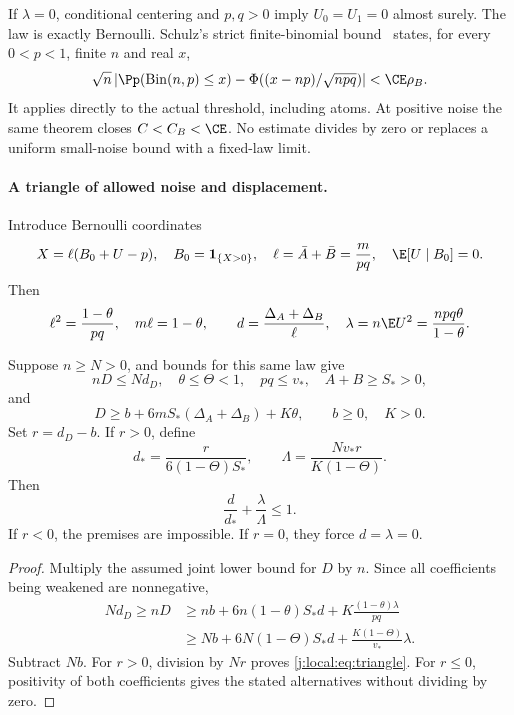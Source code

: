 If $\lambda=0$, conditional centering and $p,q>0$ imply $U_0=U_1=0$
almost surely. The law is exactly Bernoulli. Schulz's strict finite-binomial
bound~\cite[Theorem~1]{Schulz2016} states, for every $0<p<1$, finite $n$
and real $x$,
\[
 \sqrt n\left|\Pp(\operatorname{Bin}(n,p)\le x)
 -\Phi((x-np)/\sqrt{npq})\right|<\CE\rho_B.
\]
It applies directly to the actual threshold, including atoms. At positive
noise the same theorem closes $C<C_B<\CE$. No estimate divides by zero
or replaces a uniform small-noise bound with a fixed-law limit.

\paragraph{A triangle of allowed noise and displacement.}
Introduce Bernoulli coordinates
\[
 X=\ell(B_0+U-p),\quad B_0=\mathbf1_{\{X>0\}},\quad
 \ell=\bar A+\bar B=\frac m{pq},\quad \E[U\mid B_0]=0.
\]
Then
\[
 \ell^2=\frac{1-\theta}{pq},\quad m\ell=1-\theta,
 \qquad d=\frac{\Delta_A+\Delta_B}{\ell},\quad
 \lambda=n\E U^2=\frac{npq\theta}{1-\theta}.
\]

\begin{theorem}\label{j:local:triangle}
Suppose $n\ge N>0$, and bounds for this same law give
\[
 nD\le N d_D,\quad \theta\le\Theta<1,\quad pq\le v_*,
 \quad A+B\ge S_*>0,
\]
and
\[
 D\ge b+6mS_*(\Delta_A+\Delta_B)+K\theta,
 \qquad b\ge0,\quad K>0.
\]
Set $r=d_D-b$. If $r>0$, define
\[
 d_* =\frac{r}{6(1-\Theta)S_*},\qquad
 \Lambda=\frac{Nv_*r}{K(1-\Theta)}.
\]
Then
\begin{equation}\label{j:local:eq:triangle}
                 \boxed{\displaystyle
                   \frac d{d_*}+\frac\lambda\Lambda\le1.}
\end{equation}
If $r<0$, the premises are impossible. If $r=0$, they force
$d=\lambda=0$.
\end{theorem}
\begin{proof}
Multiply the assumed joint lower bound for $D$ by $n$. Since all
coefficients being weakened are nonnegative,
\begin{align*}
 Nd_D\ge nD
 &\ge nb+6n(1-\theta)S_*d+K\frac{(1-\theta)\lambda}{pq}\\
 &\ge Nb+6N(1-\Theta)S_*d+\frac{K(1-\Theta)}{v_*}\lambda.
\end{align*}
Subtract $Nb$. For $r>0$, division by $Nr$ proves
\eqref{j:local:eq:triangle}. For $r\le0$, positivity of both coefficients gives
the stated alternatives without dividing by zero.
\end{proof}

